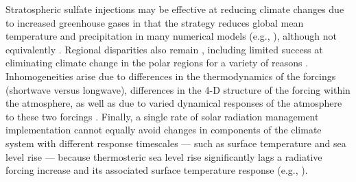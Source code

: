 \documentclass[grl]{AGUTeX}  %
\begin{document}
\begin{article}
Stratospheric sulfate injections may be effective at reducing climate changes due to increased greenhouse gases in that the strategy reduces global mean temperature and precipitation in many numerical models (e.g., \cite{kravitz13}), although not equivalently \citep{bala08}. Regional disparities also remain \citep{ricke10}, including limited success at eliminating climate change  in the polar regions for a variety of reasons \citep{mccusker12}. Inhomogeneities arise due to differences in the thermodynamics of the forcings (shortwave versus longwave), differences in the 4-D structure of the forcing within the atmosphere, as well as due to varied dynamical responses of the atmosphere to these two forcings \citep{ammann10,mccusker12}. Finally, a single rate of solar radiation management implementation cannot equally avoid changes in components of the climate system with different response timescales --- such as surface temperature and sea level rise \citep{irvine12} --- because thermosteric sea level rise significantly lags a radiative forcing increase and its associated surface temperature response (e.g., \cite{wigley06,solomon10}). 




\end{article}
\end{document}
